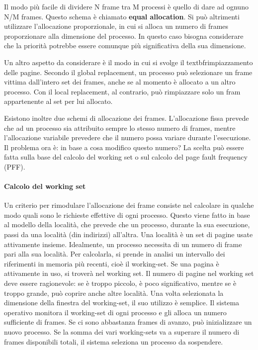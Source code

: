 \documentclass[a4paper]{article}
\begin{document}
Il modo più facile di dividere N frame tra M processi è quello di dare ad ognuno N/M frames. Questo schema è chiamato \textbf{equal allocation}. Si può altrimenti utilizzare l'allocazione proporzionale, in cui si alloca un numero di frames proporzionare alla dimensione del processo. In questo caso bisogna considerare che la priorità potrebbe essere comunque più significativa della sua dimensione.

Un altro aspetto da considerare è il modo in cui si svolge il textbf{rimpiazzamento delle pagine}. Secondo il global replacement, un processo può selezionare un frame vittima dall'intero set dei frames, anche se al momento è allocato a un altro processo. Con il local replacement, al contrario, può rimpiazzare solo un fram appartenente al set per lui allocato.

Esistono inoltre due schemi di allocazione dei frames. L'allocazione fissa prevede che ad un processo sia attribuito sempre lo stesso numero di frames, mentre l'allocazione variabile prevedere che il numero possa variare durante l'esecuzione. Il problema ora è: in base a cosa modifico questo numero? La scelta può essere fatta sulla base del calcolo del working set o sul calcolo del page fault frequency (PFF).

\paragraph{Calcolo del working set}
Un criterio per rimodulare l'allocazione dei frame consiste nel calcolare in qualche modo quali sono le richieste effettive di ogni processo. Questo viene fatto in base al modello della località, che prevede che un processo, durante la sua esecuzione, passi da una località (din indirizzi) all'altra. Una località è un set di pagine usate attivamente insieme. Idealmente, un processo necessita di un numero di frame pari alla sua località. Per calcolarla, si prende in analisi un intervallo dei riferimenti in memoria più recenti, cioè il working-set. Se una pagina è attivamente in uso, si troverà nel working set. Il numero di pagine nel working set deve essere ragionevole: se è troppo piccolo, è poco significativo, mentre se è troppo grande, può coprire anche altre località. Una volta selezionata la dimensione della finestra del working-set, il suo utilizzo è semplice. Il sistema operativo monitora il working-set di ogni processo e gli alloca un numero sufficiente di frames. Se ci sono abbastanza frames di avanzo, può inizializzare un nuovo processo. Se la somma dei vari working-sets va a superare il numero di frames disponibili totali, il sistema seleziona un processo da sospendere.
\end{document}
